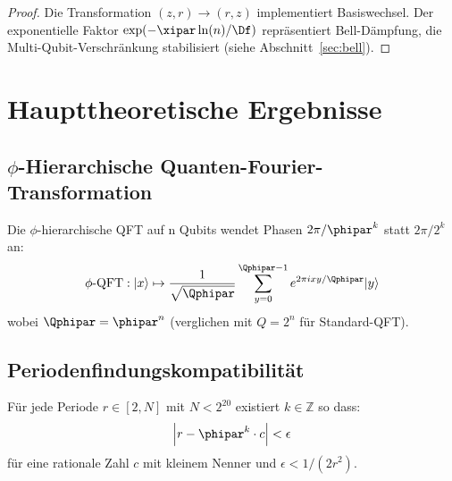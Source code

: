 \begin{proof}
	Die Transformation $(z, r) \to (r, z)$ implementiert Basiswechsel. Der exponentielle Faktor $\exp(-\xipar \ln(n)/\Df)$ repräsentiert Bell-Dämpfung, die Multi-Qubit-Verschränkung stabilisiert (siehe Abschnitt~\ref{sec:bell}).
\end{proof}

\section{Haupttheoretische Ergebnisse}
\label{sec:maintheorem}

\subsection{$\phi$-Hierarchische Quanten-Fourier-Transformation}

\begin{definition}
	Die $\phi$-hierarchische QFT auf n Qubits wendet Phasen $2\pi/\phipar^k$ statt $2\pi/2^k$ an:
	\begin{equation}
		\text{$\phi$-QFT}: |x\rangle \mapsto \frac{1}{\sqrt{\Qphipar}} \sum_{y=0}^{\Qphipar-1} e^{2\pi i xy / \Qphipar} |y\rangle
	\end{equation}
	wobei $\Qphipar = \phipar^n$ (verglichen mit $Q = 2^n$ für Standard-QFT).
\end{definition}

\subsection{Periodenfindungskompatibilität}

\begin{lemma}
	\label{lem:phi_coverage}
	Für jede Periode $r \in [2, N]$ mit $N < 2^{20}$ existiert $k \in \mathbb{Z}$ so dass:
	\begin{equation}
		\left| r - \phipar^k \cdot c \right| < \epsilon
	\end{equation}
	für eine rationale Zahl $c$ mit kleinem Nenner und $\epsilon < 1/(2r^2)$.
\end{lemma}

